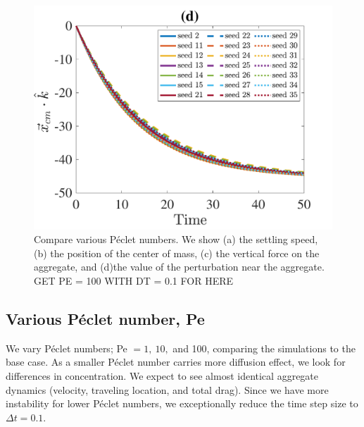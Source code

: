 \begin{figure}[ht]
\begin{center}
		\includegraphics[scale=1]{./figures/fig_NC50_sd_cm3_all}
	\caption{Compare various Péclet numbers. We show (a) the settling speed, (b) the position of the center of mass, (c) the vertical force on the aggregate, and (d)the value of the perturbation near the aggregate. GET PE = 100 WITH DT = 0.1 FOR HERE}
	\label{fig_NC50_Seeds}
\end{center}
\end{figure}
\clearpage
\subsection{Various Péclet number, Pe}
We vary Péclet numbers; Pe $=1, \ 10, $ and 100, comparing the simulations to the base case.  As a smaller Péclet number carries more diffusion effect, we look for differences in concentration. We expect to see almost identical aggregate dynamics (velocity, traveling location, and total drag). 
Since we have more instability for lower Péclet numbers, we exceptionally reduce the time step size to $\Delta t = 0.1$.


